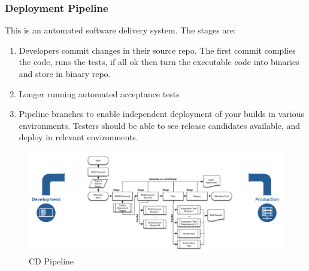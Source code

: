\documentclass{article}
\begin{document}
\subsubsection{Deployment Pipeline}
This is an automated software delivery system. The stages are:
\begin{enumerate}
    \item Developers commit changes in their source repo. The first commit complies the code, runs the tests, if all ok then turn the executable code into binaries and store in binary repo.
    \item Longer running automated acceptance tests
    \item Pipeline branches to enable independent deployment of your builds in various environments. Testers should be able to see release candidates available, and deploy in relevant environments. 
\end{enumerate}
\begin{figure}[H]
    \centering
    \includegraphics[width = 0.8\linewidth]{Pictures/Screenshot 2023-02-11 at 16.30.40.png}
    \caption{CD Pipeline}
\end{figure}
\end{document}
